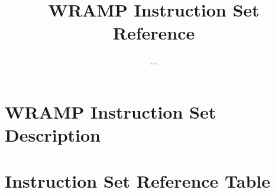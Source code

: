 \documentclass[a4paper]{book}
\title{WRAMP Instruction Set Reference}
\author{...}
\begin{document}
\chapter*{WRAMP Instruction Set Description}

\chapter*{Instruction Set Reference Table}
\addtolength{\hoffset}{-1cm}
\addtolength{\textwidth}{1cm}

\end{document}
